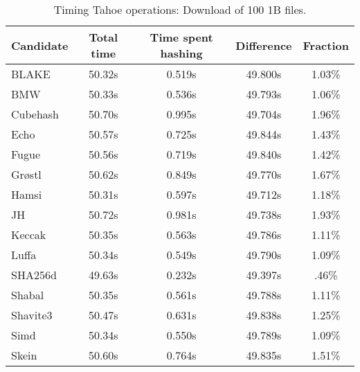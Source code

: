 \begin{table}[h]
  \centering
  \caption{Timing Tahoe operations: Download of 100 1B files.}
  \begin{tabular}{ | l | c | c | c | c | }
    \hline
    Candidate & Total time & Time spent hashing & Difference & Fraction \\ \hline
    BLAKE     &  50.32s  &  0.519s  &  49.800s  &  1.03\%  \\  \hline
    BMW       &  50.33s  &  0.536s  &  49.793s  &  1.06\%  \\  \hline
    Cubehash  &  50.70s  &  0.995s  &  49.704s  &  1.96\%  \\  \hline
    Echo      &  50.57s  &  0.725s  &  49.844s  &  1.43\%  \\  \hline
    Fugue     &  50.56s  &  0.719s  &  49.840s  &  1.42\%  \\  \hline
    Grøstl    &  50.62s  &  0.849s  &  49.770s  &  1.67\%  \\  \hline
    Hamsi     &  50.31s  &  0.597s  &  49.712s  &  1.18\%  \\  \hline
    JH        &  50.72s  &  0.981s  &  49.738s  &  1.93\%  \\  \hline
    Keccak    &  50.35s  &  0.563s  &  49.786s  &  1.11\%  \\  \hline
    Luffa     &  50.34s  &  0.549s  &  49.790s  &  1.09\%  \\  \hline
    SHA256d   &  49.63s  &  0.232s  &  49.397s  &  .46\%   \\  \hline
    Shabal    &  50.35s  &  0.561s  &  49.788s  &  1.11\%  \\  \hline
    Shavite3  &  50.47s  &  0.631s  &  49.838s  &  1.25\%  \\  \hline
    Simd      &  50.34s  &  0.550s  &  49.789s  &  1.09\%  \\  \hline
    Skein     &  50.60s  &  0.764s  &  49.835s  &  1.51\%  \\  \hline
  \end{tabular}
  \label{tbl:hashingtimes:get1b}
\end{table}
